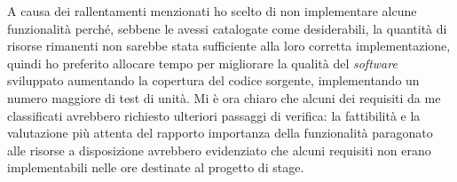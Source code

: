 A causa dei rallentamenti menzionati ho scelto di non implementare alcune funzionalità perché, sebbene le avessi catalogate come desiderabili, la quantità di risorse rimanenti non sarebbe stata sufficiente alla loro corretta implementazione, quindi ho preferito allocare tempo per migliorare la qualità del \emph{software} sviluppato aumentando la copertura del codice sorgente, implementando un numero maggiore di test di unità. Mi è ora chiaro che alcuni dei requisiti da me classificati avrebbero richiesto ulteriori passaggi di verifica: la fattibilità e la valutazione più attenta del rapporto importanza della funzionalità paragonato alle risorse a disposizione avrebbero evidenziato che alcuni requisiti non erano implementabili nelle ore destinate al progetto di stage.
